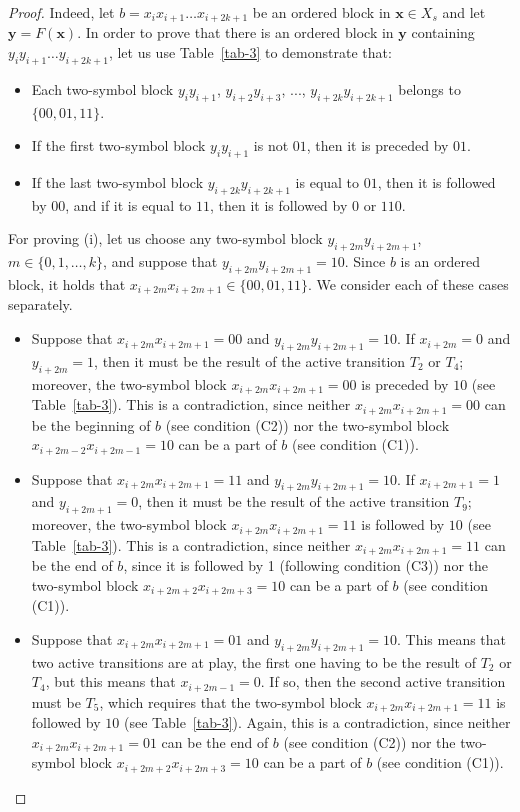 \documentclass{sn-jnl}
\newcommand{\xconst}{X_{s}}
\newcommand{\bx}{\mathbf{x}}
\newcommand{\by}{\mathbf{y}}
\begin{document}
\begin{proof}
Indeed, let $b=x_{i}x_{i+1}\ldots x_{i+2k+1}$ be an ordered block in $\bx\in \xconst$ and let $\by=F(\bx)$.
In order to prove that there is an ordered block in $\by$ containing $y_{i}y_{i+1}\ldots y_{i+2k+1}$, let us use Table~\ref{tab-3} to demonstrate that:
\begin{itemize}
    \item[(i)] Each two-symbol block $y_{i}y_{i+1}$, $y_{i+2}y_{i+3}$, ..., $y_{i+2k}y_{i+2k+1}$ belongs to $\{00, 01,11\}$.
    \item[(ii)] If the first two-symbol block $y_iy_{i+1}$ is not $01$, then it is preceded by $01$.
    \item[(iii)] If the last two-symbol block $y_{i+2k}y_{i+2k+1}$ is equal to $01$, then it is followed by $00$, and if it is equal to $11$, then it is followed by $0$ or $110$.
\end{itemize}

For proving (i), let us choose any two-symbol block $y_{i+2m}y_{i+2m+1}$, $m\in\{0,1,\ldots,k\}$, and suppose that $y_{i+2m}y_{i+2m+1}=10$. Since $b$ is an ordered block, it holds that $x_{i+2m}x_{i+2m+1}\in\{00, 01,11\}$. We consider each of these cases separately.
\begin{itemize}
\item[(a)] Suppose that $x_{i+2m}x_{i+2m+1}=00$ and $y_{i+2m}y_{i+2m+1}=10$. If $x_{i+2m}=0$ and $y_{i+2m}=1$, then it must be the result of the active transition $T_2$ or $T_4$; moreover, the two-symbol block $x_{i+2m}x_{i+2m+1}=00$ is preceded by $10$ (see Table~\ref{tab-3}). This is a contradiction, since neither $x_{i+2m}x_{i+2m+1}=00$ can be the beginning of $b$ (see condition {\rm (C2)}) nor the two-symbol block $x_{i+2m-2}x_{i+2m-1}=10$ can be a part of $b$ (see condition {\rm (C1)}).
   
\item[(b)]  Suppose that $x_{i+2m}x_{i+2m+1}=11$ and $y_{i+2m}y_{i+2m+1}=10$. If $x_{i+2m+1}=1$ and $y_{i+2m+1}=0$, then it must be the result of the active transition $T_9$; moreover, the two-symbol block $x_{i+2m}x_{i+2m+1}=11$ is followed by $10$ (see Table~\ref{tab-3}). This is a contradiction, since neither $x_{i+2m}x_{i+2m+1}=11$ can be the end of $b$, since it is followed by 1 (following condition {\rm (C3)}) nor the two-symbol block $x_{i+2m+2}x_{i+2m+3}=10$ can be a part of $b$ (see condition {\rm (C1)}).
    
\item[(c)]  Suppose that $x_{i+2m}x_{i+2m+1}=01$ and $y_{i+2m}y_{i+2m+1}=10$. This means that two active transitions are at play, the first one having to be the result of $T_2$ or $T_4$, but this means that $x_{i+2m-1}=0$. If so, then the second active transition must be $T_5$, which requires that the two-symbol block $x_{i+2m}x_{i+2m+1}=11$ is followed by $10$ (see Table~\ref{tab-3}). Again, this is a contradiction, since neither $x_{i+2m}x_{i+2m+1}=01$ can be the end of $b$ (see condition {\rm (C2)}) nor the two-symbol block $x_{i+2m+2}x_{i+2m+3}=10$ can be a part of $b$ (see condition {\rm (C1)}). 
\end{itemize}


\end{proof}
\end{document}
